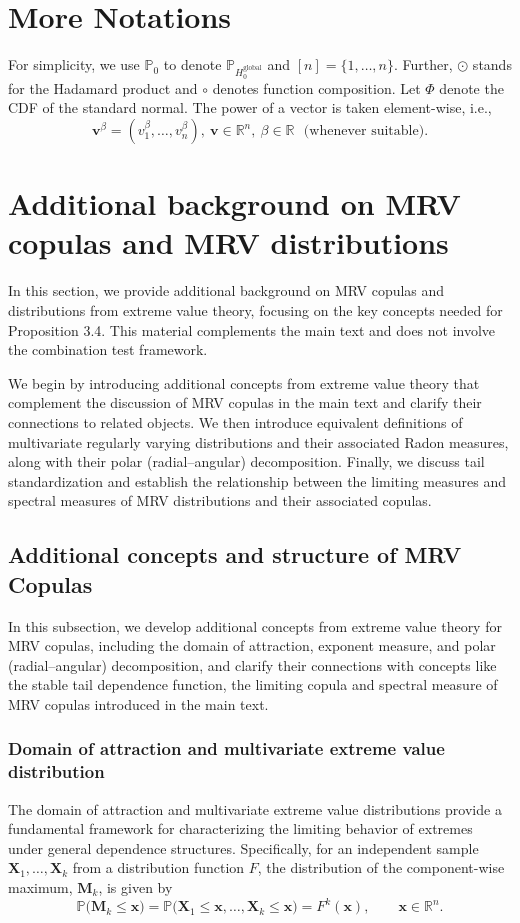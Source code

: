 \documentclass[12pt]{article}
\theoremstyle{plain}
\theoremstyle{plain}
\theoremstyle{definition}
\renewcommand{\Pr}{\mathbb{P}}
\newcommand{\R}{\mathbb{R}}
\begin{document}
\vspace{0.7cm}

\section{More Notations}
For simplicity, we use $\Pr_0$ to denote $\Pr_{H_0^\mathrm{global}}$ and $[n]=\{1,\dots,n\}$. Further, $\odot$ stands for the Hadamard product and $\circ$ denotes function composition. Let $\Phi$ denote the CDF of the standard normal. %
The power of a vector is taken element-wise, i.e.,
\[
\mathbf{v}^{\beta} = (v_1^{\beta},\dots,v_n^\beta),~\mathbf{v}\in\R^n,~\beta\in\R ~~~\mbox{(whenever suitable)}.
\]

\section{Additional background on MRV copulas and MRV distributions}
In this section, we provide additional background on MRV copulas and  distributions from extreme value theory, focusing on the key concepts needed for Proposition 3.4. This material complements the main text and does not involve the combination test framework.

We begin by introducing additional concepts from extreme value theory that complement the discussion of MRV copulas in the main text and clarify their connections to related objects. We then introduce equivalent definitions of multivariate regularly varying distributions and their associated Radon measures, along with their polar (radial–angular) decomposition. Finally, we discuss tail standardization and establish the relationship between the limiting measures and spectral measures of MRV distributions and their associated copulas.



\subsection{Additional concepts and structure of MRV Copulas}
In this subsection, we develop additional concepts from extreme value theory for MRV copulas, including the domain of attraction, exponent measure, and polar (radial–angular) decomposition, and clarify their connections with concepts like the stable tail dependence function, the limiting copula and spectral measure of MRV copulas introduced in the main text.

\subsubsection{Domain of attraction and multivariate extreme value distribution}
The domain of attraction and multivariate extreme value distributions provide a fundamental framework for characterizing the limiting behavior of extremes under general dependence structures. Specifically, for an independent
sample $\mathbf{X}_1,\ldots,\mathbf{X}_k$ from a distribution function $F$, the distribution of the component-wise maximum, $\mathbf{M}_k$,  is given by
\[
\mathbb{P}\bigl(\mathbf{M}_k \le \mathbf{x}\bigr)
= \mathbb{P}\bigl(\mathbf{X}_1 \le \mathbf{x}, \ldots, \mathbf{X}_k \le \mathbf{x}\bigr)
= F^k(\mathbf{x}), \qquad \mathbf{x} \in \mathbb{R}^n .
\]
\end{document}
